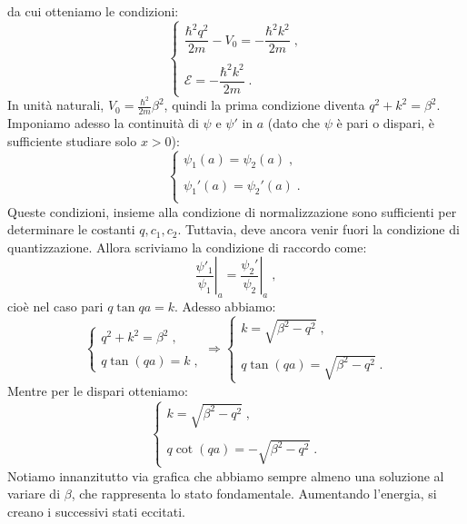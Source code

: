 \documentclass[10pt,a4paper]{report}
\theoremstyle{definition}
\numberwithin{equation}{section}
\begin{document}
da cui otteniamo le condizioni:
\begin{equation}
\begin{cases}
\dfrac{\hbar^2q^2}{2m}-V_0=-\dfrac{\hbar^2k^2}{2m}\;, \\
\\
\mathcal{E}=-\dfrac{\hbar^2k^2}{2m}\;.
\end{cases}
\end{equation}
In unità naturali, $V_0=\frac{\hbar^2}{2m}\beta^2$, quindi la prima condizione diventa $q^2+k^2=\beta^2$. Imponiamo adesso la continuità di $\psi$ e $\psi'$ in $a$ (dato che $\psi$ è pari o dispari, è sufficiente studiare solo $x>0$):
\begin{equation}
\begin{cases}
\psi_1(a)=\psi_2(a)\;, \\
\\
\psi_1'(a)=\psi_2'(a)\;. \\
\end{cases}
\end{equation}
Queste condizioni, insieme alla condizione di normalizzazione sono sufficienti per determinare le costanti $q,c_1,c_2$. Tuttavia, deve ancora venir fuori la condizione di quantizzazione. Allora scriviamo la condizione di raccordo come:
\begin{equation}
\left.\frac{\psi'_1}{\psi_1}\right|_a=\left.\frac{\psi_2'}{\psi_2}\right|_a\;,
\end{equation}
cioè nel caso pari $q\tan qa=k$. Adesso abbiamo:
\begin{equation}
\begin{cases}
q^2+k^2=\beta^2\;, \\
\\
q\tan(qa)=k\;,
\end{cases} \Longrightarrow
\begin{cases}
k=\sqrt{\beta^2-q^2}\;, \\
\\
q\tan(qa)=\sqrt{\beta^2-q^2}\;.
\end{cases}
\end{equation}
Mentre per le dispari otteniamo:
\begin{equation}
\begin{cases}
k=\sqrt{\beta^2-q^2}\;, \\
\\
q \cot(qa) =-\sqrt{\beta^2-q^2}\;.
\end{cases}
\end{equation}
Notiamo innanzitutto via grafica che abbiamo sempre almeno una soluzione al variare di $\beta$, che rappresenta lo stato fondamentale. Aumentando l'energia, si creano i successivi stati eccitati. \\
\end{document}
